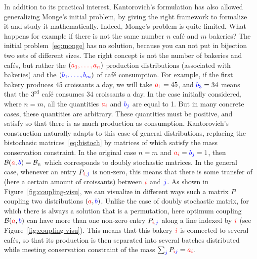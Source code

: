 In addition to its practical interest, Kantorovich's formulation has also allowed generalizing Monge's initial problem, by giving the right framework to formalize it and study it mathematically. Indeed, Monge's problem is quite limited. What happens for example if there is not the same number $n$ caf\'e and $m$ bakeries? The initial problem~\eqref{eq:monge} has no solution, because you can not put in bijection two sets of different sizes. The right concept is not the number of bakeries and caf\'es, but rather the $({\color{red}a_1, \ldots, a_n})$ production distributions (associated with bakeries) and the $({\color{blue}b_1, \ldots, b_m})$ of caf\'e consumption.
%
For example, if the first bakery produces 45 croissants a day, we will take ${\color{red}a_1}=45$, and ${\color{blue}b_3}=34$ means that the $3^\text{rd}$ caf\'e consumes 34 croissants a day.
%
In the case initially considered, where $n=m$, all the quantities ${\color{red}a_i}$ and ${\color{blue}b_j}$ are equal to 1. But in many concrete cases, these quantities are arbitrary. These quantities must be positive, and satisfy
so that there is as much production as consumption. Kantorovich's construction naturally adapts to this case of general distributions, replacing the bistochasic matrices~\eqref{eq:bistoch} by matrices of  which satisfy the mass conservation constraint.
In the original case $n=m$ and ${\color{red}a_i} = {\color{blue}b_j} = 1$, then $\mathcal{B}({\color{red}a}, {\color{blue}b}) = \mathcal{B}_n$ which corresponds to doubly stochastic matrices. In the general case, whenever an entry $P_{{\color{red}i}, {\color{blue}j}}$ is non-zero, this means that there is some transfer of  (here a certain amount of croissants) between ${\color{red}i}$ and ${\color{blue}j}$. As shown in Figure~\ref{fig:coupling-visu}, we can visualize in different ways such a matrix $P$ coupling two distributions $({\color{red}a}, {\color{blue}b})$.
%
Unlike the case of doubly stochastic matrix, for which there is always a solution that is a permutation, here optimum coupling $\mathcal{B}({\color{red}a}, {\color{blue}b})$ can have more than one non-zero entry $P_{{\color{red}i},{\color{blue}j}}$ along a line indexed by ${\color{red}i}$ (see Figure~\ref{fig:coupling-visu}). This means that this bakery ${\color{red}i}$ is connected to several caf\'es, so that its production is then separated into several  batches distributed while meeting conservation constraint of the mass $\sum_{{\color{blue}j}} P_{{\color{red}i} {\color{blue}j}} = {\color{red}a_i}$.


